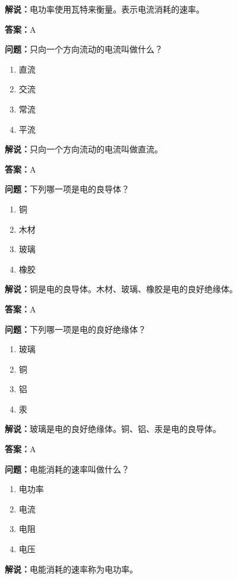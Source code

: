 \textbf{解说：}电功率使用瓦特来衡量。表示电流消耗的速率。

\textbf{答案：}A

\textbf{问题：}只向一个方向流动的电流叫做什么？

\begin{enumerate}[label=\Alph*), leftmargin=3em]
	\item 直流
	\item 交流
	\item 常流
	\item 平流
\end{enumerate}

\textbf{解说：}只向一个方向流动的电流叫做直流。

\textbf{答案：}A

\textbf{问题：}下列哪一项是电的良导体？

\begin{enumerate}[label=\Alph*), leftmargin=3em]
	\item 铜
	\item 木材
	\item 玻璃
	\item 橡胶
\end{enumerate}

\textbf{解说：}铜是电的良导体。木材、玻璃、橡胶是电的良好绝缘体。

\textbf{答案：}A

\textbf{问题：}下列哪一项是电的良好绝缘体？

\begin{enumerate}[label=\Alph*), leftmargin=3em]
	\item 玻璃
	\item 铜
	\item 铝
	\item 汞
\end{enumerate}

\textbf{解说：}玻璃是电的良好绝缘体。铜、铝、汞是电的良导体。

\textbf{答案：}A

\textbf{问题：}电能消耗的速率叫做什么？

\begin{enumerate}[label=\Alph*), leftmargin=3em]
	\item 电功率
	\item 电流
	\item 电阻
	\item 电压
\end{enumerate}

\textbf{解说：}电能消耗的速率称为电功率。

